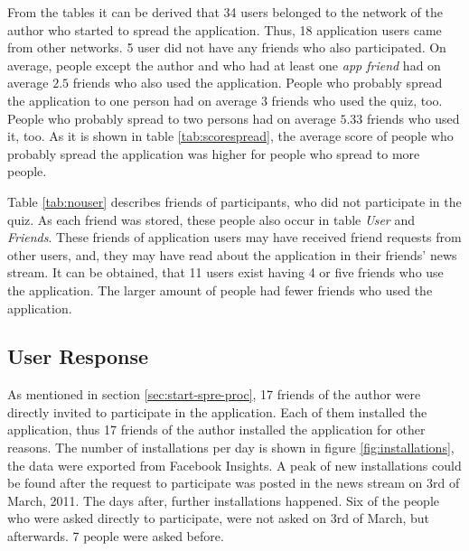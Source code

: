 \documentclass[preprint,12pt]{elsarticle}
\begin{document}
From the tables it can be derived that 34 users belonged to the
network of the author who started to spread the application. Thus, 18
application users came from other networks. 5 user did not have any
friends who also participated. On average, people except the author
and who had at least one \textit{app friend} had on average $2.5$ friends who also
used the application. People who probably spread the application to
one person had on average $3$ friends who used the quiz, too. People
who probably spread to two persons had on average $5.33$ friends who
used it, too. As it is shown in table \ref{tab:scorespread},
the average score of people who probably spread 
the application was higher for people who spread to more people. 

Table \ref{tab:nouser} describes friends of participants, who did not
participate in the quiz. As each friend was stored, these people also
occur in table \textit{User} and \textit{Friends}. These friends of
application users may have received friend requests from other users,
and, they may have read about the application in their friends' news
stream.
It can be obtained, that 11 users exist having 4 or five friends who
use the application. The larger amount of people had fewer friends who
used the application.


\subsection{User Response}
\label{sec:user-response}
As mentioned in section \ref{sec:start-spre-proc}, 17 friends of the author were
directly invited to participate in the application. Each of them
installed the application, thus 17 friends of the author installed the
application for other reasons. The number of installations per day is
shown in figure \ref{fig:installations}, the data were exported from
Facebook Insights. A peak of new installations could be
found after the request to participate was posted in the news stream
on 3rd of March, 2011. The days after, further installations
happened. Six of the people who were asked directly to participate,
were not asked on 3rd of March, but afterwards. 7 people were asked
before.
\end{document}

